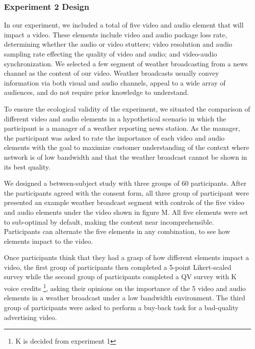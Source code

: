 \subsubsection{Experiment 2 Design}
In our experiment, we included a total of five video and audio element that will impact a video.
These elements include video and audio package loss rate, 
determining whether the audio or video stutters; 
video resolution and audio sampling rate 
effecting the quality of video and audio; 
and video-audio synchronization. 
We selected a few segment of weather broadcasting 
from a news channel 
as the content of our video.
Weather broadcasts usually convey information via both visual and audio channels, 
appeal to a wide array of audiences, 
and do not require prior knowledge to understand.\par

To ensure the ecological validity of the experiment, 
we situated the comparison of different video and audio elements 
in a hypothetical scenario in which the participant 
is a manager of a weather reporting news station. 
As the manager, 
the participant was asked to rate 
the importance of each video and audio elements 
with the goal to maximize customer understanding of the context
where network is of low bandwidth and that the weather broadcast 
cannot be shown in its best quality.\par

We designed a between-subject study
with three groups of 60 participants.
After the participants agreed with the consent form, 
all three group of participant
were presented an example weather broadcast segment
with controls of the five video and audio elements 
under the video shown in figure M. 
All five elements were set to sub-optimal by default, 
making the content near incomprehensible.
Participants can alternate the five elements 
in any combination, 
to see how elements impact to the video.

Once participants think that they had a grasp of 
how different elements impact a video, 
the first group of participants 
then completed a 5-point Likert-scaled survey 
while the second group of participants 
completed a QV survey with K voice credits \footnote{K is decided from experiment 1}, 
asking their opinions 
on the importance of the 5 video and audio elements 
in a weather broadcast 
under a low bandwidth environment. 
The third group of participants 
were asked to perform a buy-back task 
for a bad-quality advertising video.\par

